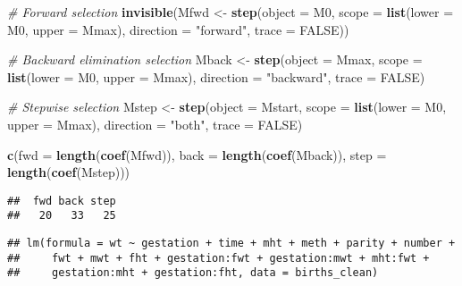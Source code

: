 \documentclass[]{article}
\newenvironment{Shaded}{\begin{snugshade}}{\end{snugshade}}
\newcommand{\KeywordTok}[1]{\textcolor[rgb]{0.13,0.29,0.53}{\textbf{#1}}}
\newcommand{\DataTypeTok}[1]{\textcolor[rgb]{0.13,0.29,0.53}{#1}}
\newcommand{\StringTok}[1]{\textcolor[rgb]{0.31,0.60,0.02}{#1}}
\newcommand{\CommentTok}[1]{\textcolor[rgb]{0.56,0.35,0.01}{\textit{#1}}}
\newcommand{\OtherTok}[1]{\textcolor[rgb]{0.56,0.35,0.01}{#1}}
\newcommand{\OperatorTok}[1]{\textcolor[rgb]{0.81,0.36,0.00}{\textbf{#1}}}
\newcommand{\NormalTok}[1]{#1}
\begin{document}
\begin{Shaded}
\begin{Highlighting}[]
\CommentTok{# Forward selection}
\KeywordTok{invisible}\NormalTok{(Mfwd <-}\StringTok{ }\KeywordTok{step}\NormalTok{(}\DataTypeTok{object =}\NormalTok{ M0,}
               \DataTypeTok{scope =} \KeywordTok{list}\NormalTok{(}\DataTypeTok{lower =}\NormalTok{ M0, }\DataTypeTok{upper =}\NormalTok{ Mmax),}
               \DataTypeTok{direction =} \StringTok{"forward"}\NormalTok{, }\DataTypeTok{trace =} \OtherTok{FALSE}\NormalTok{))}

\CommentTok{# Backward elimination selection}
\NormalTok{Mback <-}\StringTok{ }\KeywordTok{step}\NormalTok{(}\DataTypeTok{object =}\NormalTok{ Mmax, }
              \DataTypeTok{scope =} \KeywordTok{list}\NormalTok{(}\DataTypeTok{lower =}\NormalTok{ M0, }\DataTypeTok{upper =}\NormalTok{ Mmax),}
              \DataTypeTok{direction =} \StringTok{"backward"}\NormalTok{, }\DataTypeTok{trace =} \OtherTok{FALSE}\NormalTok{)}

\CommentTok{# Stepwise selection}
\NormalTok{Mstep <-}\StringTok{ }\KeywordTok{step}\NormalTok{(}\DataTypeTok{object =}\NormalTok{ Mstart,}
              \DataTypeTok{scope =} \KeywordTok{list}\NormalTok{(}\DataTypeTok{lower =}\NormalTok{ M0, }\DataTypeTok{upper =}\NormalTok{ Mmax),}
              \DataTypeTok{direction =} \StringTok{"both"}\NormalTok{, }\DataTypeTok{trace =} \OtherTok{FALSE}\NormalTok{)}

\KeywordTok{c}\NormalTok{(}\DataTypeTok{fwd =} \KeywordTok{length}\NormalTok{(}\KeywordTok{coef}\NormalTok{(Mfwd)), }\DataTypeTok{back =} \KeywordTok{length}\NormalTok{(}\KeywordTok{coef}\NormalTok{(Mback)), }\DataTypeTok{step =} \KeywordTok{length}\NormalTok{(}\KeywordTok{coef}\NormalTok{(Mstep)))}
\end{Highlighting}
\end{Shaded}

\begin{verbatim}
##  fwd back step 
##   20   33   25
\end{verbatim}

\begin{Shaded}
\end{Shaded}

\begin{verbatim}
## lm(formula = wt ~ gestation + time + mht + meth + parity + number + 
##     fwt + mwt + fht + gestation:fwt + gestation:mwt + mht:fwt + 
##     gestation:mht + gestation:fht, data = births_clean)
\end{verbatim}
\end{document}
